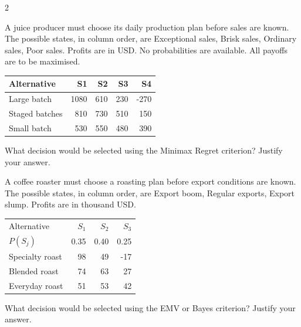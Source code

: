 \begin{multicols}{2}
\begin{minipage}{\linewidth}
A juice producer must choose its daily production plan before sales are known. The possible states, in column order, are Exceptional sales, Brisk sales, Ordinary sales, Poor sales. Profits are in USD. No probabilities are available. All payoffs are to be maximised.
\begin{center}\small\setlength{\tabcolsep}{4pt}
\begin{tabular}{@{}lrrrr@{}}\toprule
Alternative&S1&S2&S3&S4\\\midrule
Large batch&1080&610&230&-270\\
Staged batches&810&730&510&150\\
Small batch&530&550&480&390\\\bottomrule
\end{tabular}\end{center}

What decision would be selected using the Minimax Regret criterion? Justify your answer. 
\end{minipage}\par

\begin{minipage}{\linewidth}
A coffee roaster must choose a roasting plan before export conditions are known. The possible states, in column order, are Export boom, Regular exports, Export slump. Profits are in thousand USD.
\begin{center}\small\setlength{\tabcolsep}{4pt}
\begin{tabular}{@{}lrrr@{}}\toprule
Alternative&$S_1$&$S_2$&$S_3$\\
$P(S_j)$&0.35&0.40&0.25\\\midrule
Specialty roast&98&49&-17\\
Blended roast&74&63&27\\
Everyday roast&51&53&42\\\bottomrule
\end{tabular}\end{center}

What decision would be selected using the EMV or Bayes criterion? Justify your answer. 
\end{minipage}\par


\end{multicols}

